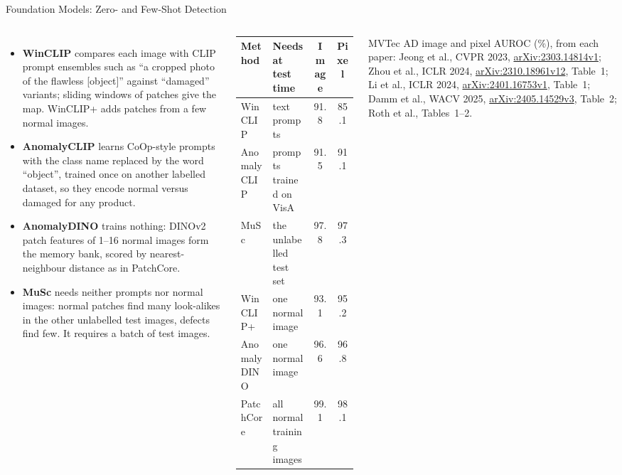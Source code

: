 \begin{frame}{Foundation Models: Zero- and Few-Shot Detection}
  \begin{columns}[T,onlytextwidth]
      \begin{itemize}\footnotesize\itemsep0.3em
        \item \textbf{WinCLIP} compares each image with CLIP prompt ensembles such as ``a cropped photo of the flawless [object]'' against ``damaged'' variants; sliding windows of patches give the map. WinCLIP+ adds patches from a few normal images.
        \item \textbf{AnomalyCLIP} learns CoOp-style prompts with the class name replaced by the word ``object'', trained once on another labelled dataset, so they encode normal versus damaged for any product.
        \item \textbf{AnomalyDINO} trains nothing: DINOv2 patch features of 1--16 normal images form the memory bank, scored by nearest-neighbour distance as in PatchCore.
        \item \textbf{MuSc} needs neither prompts nor normal images: normal patches find many look-alikes in the other unlabelled test images, defects find few. It requires a batch of test images.
      \end{itemize}
      \centering
      \vspace{0.8em}
      {\scriptsize
      \begin{tabular}{l >{\raggedright\arraybackslash}p{2.1cm} c c}
        \toprule
        \textbf{Method} & \textbf{Needs at test time} & \textbf{Image} & \textbf{Pixel} \\
        \midrule
        WinCLIP & text prompts & 91.8 & 85.1 \\
        AnomalyCLIP & prompts trained on VisA & 91.5 & 91.1 \\
        MuSc & the unlabelled test set & 97.8 & 97.3 \\
        \addlinespace[0.25em]
        WinCLIP+ & one normal image & 93.1 & 95.2 \\
        AnomalyDINO & one normal image & 96.6 & 96.8 \\
        \addlinespace[0.25em]
        PatchCore & all normal training images & 99.1 & 98.1 \\
        \bottomrule
      \end{tabular}\par}
      \vspace{0.4em}
      {\scriptsize MVTec AD image and pixel AUROC (\%), from each paper: Jeong et al., CVPR 2023, \href{https://arxiv.org/abs/2303.14814v1}{arXiv:2303.14814v1}; Zhou et al., ICLR 2024, \href{https://arxiv.org/abs/2310.18961v12}{arXiv:2310.18961v12}, Table~1; Li et al., ICLR 2024, \href{https://arxiv.org/abs/2401.16753v1}{arXiv:2401.16753v1}, Table~1; Damm et al., WACV 2025, \href{https://arxiv.org/abs/2405.14529v3}{arXiv:2405.14529v3}, Table~2; Roth et al., Tables~1--2.\par}
  \end{columns}
\end{frame}


